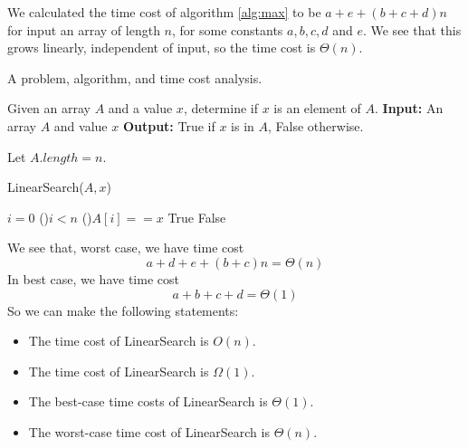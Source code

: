 \documentclass[11pt]{report}
\begin{document}
\begin{eg}
    We calculated the time cost of algorithm \ref{alg:max} to be $a+e+(b+c+d)n$ for input an array of length $n$, for some constants $a,b,c,d$ and $e$.
    We see that this grows linearly, independent of input, so the time cost is $\Theta(n)$.
\end{eg}
\pagebreak
\begin{eg} A problem, algorithm, and time cost analysis.
    \begin{nproblem}
         Given an array $A$ and a value $x$, determine if $x$ is an element of $A$. 
        \mypar
        \textbf{Input: }An array $A$ and value $x$
        \mypar
        \textbf{Output: }True if $x$ is in $A$, False otherwise. 
    \end{nproblem}
    Let $A.length = n$.\mypar
    \begin{algorithm}[H]
        \caption{LinearSearch($A, x$)}
        \label{alg:LinearSearch}
        $i = 0$
        \While(){$i < n$}
        {
            \If(){$A[i] == x$}
            {
                \Return True
            }
        }
        \Return False
    \end{algorithm}
    \mypar
    We see that, worst case, we have time cost 
    \[a+d+e+(b+c)n = \Theta(n)\]
    In best case, we have time cost 
    \[a+b+c+d = \Theta(1)\]
    So we can make the following statements:
    \begin{itemize}
        \item The time cost of LinearSearch is $O(n)$.
        \item The time cost of LinearSearch is $\Omega(1)$.
        \item The best-case time costs of LinearSearch is $\Theta(1)$.
        \item The worst-case time cost of LinearSearch is $\Theta(n)$.
    \end{itemize}
\end{eg}
\pagebreak
\end{document}
